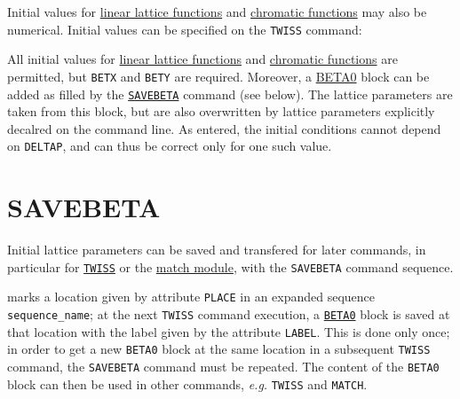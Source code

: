 Initial values for \hyperref[subsec:tables-linear]{linear
lattice functions} and \hyperref[subsec:tables-chrom]{chromatic
  functions} may also be numerical.
Initial values can be specified on the \texttt{TWISS} command:  

All initial values for
\hyperref[subsec:tables-linear]{linear lattice functions} and
\hyperref[subsec:tables-chrom]{chromatic functions} are
permitted, but \texttt{BETX} and \texttt{BETY} are required.
Moreover, a \hyperref[sec:beta0]{BETA0} block can be added as filled by the
\hyperref[sec:savebeta]{\texttt{SAVEBETA}} command (see below).
The lattice parameters are taken from this block, but are also
overwritten by lattice parameters explicitly decalred on the command 
line. As entered, the initial conditions cannot depend on
\texttt{DELTAP},
and can thus be correct only for one such value.  

\section{SAVEBETA}
\label{sec:savebeta}
Initial lattice parameters can be saved and transfered for later commands, in
particular for \hyperref[chap:twiss]{\texttt{TWISS}} or the
\hyperref[chap:match]{match module}, with the \texttt{SAVEBETA} command
sequence.   

marks a location given by attribute \texttt{PLACE} in an expanded
sequence \texttt{sequence\_name}; at the next \texttt{TWISS} command
execution, a \hyperref[sec:beta0]{\texttt{BETA0}} block is saved at that
location with the label given by the attribute \texttt{LABEL}. This is
done only once; in order to get a new \texttt{BETA0} block at the same
location in a subsequent \texttt{TWISS} command, the \texttt{SAVEBETA}
command  must be repeated. The content of the \texttt{BETA0} block can
then be used in other commands, \textsl{e.g.} \texttt{TWISS} and
\texttt{MATCH}. 

